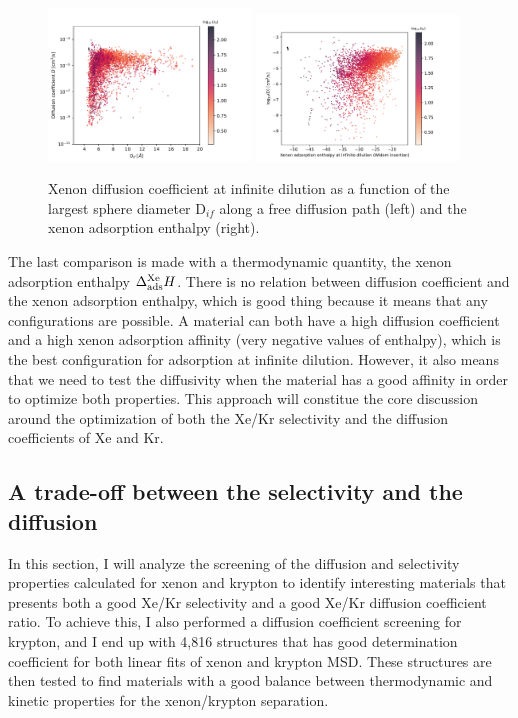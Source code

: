 \documentclass[main]{subfiles}
\begin{document}
\begin{figure}[ht]
  \centering
    \includegraphics[width=0.48\textwidth]{figures/5-diffusion/D_log-lcd_s_+.pdf}
    \includegraphics[width=0.48\textwidth]{figures/5-diffusion/D_log-H_Xe_s_+.pdf}
    \caption{Xenon diffusion coefficient at infinite dilution as a function of the largest sphere diameter D$_{if}$ along a free diffusion path (left) and the xenon adsorption enthalpy (right). }\label{fgr:diff_H_lcd}
\end{figure}

The last comparison is made with a thermodynamic quantity, the xenon adsorption enthalpy $\Delta_{\text{ads}}^{\text{Xe}}H$. There is no relation between diffusion coefficient and the xenon adsorption enthalpy, which is good thing because it means that any configurations are possible. A material can both have a high diffusion coefficient and a high xenon adsorption affinity (very negative values of enthalpy), which is the best configuration for adsorption at infinite dilution. However, it also means that we need to test the diffusivity when the material has a good affinity in order to optimize both properties. This approach will constitue the core discussion around the optimization of both the Xe/Kr selectivity and the diffusion coefficients of Xe and Kr.  

\subsection{A trade-off between the selectivity and the diffusion}

In this section, I will analyze the screening of the diffusion and selectivity properties calculated for xenon and krypton to identify interesting materials that presents both a good Xe/Kr selectivity and a good Xe/Kr diffusion coefficient ratio. To achieve this, I also performed a diffusion coefficient screening for krypton, and I end up with 4,816 structures that has good determination coefficient for both linear fits of xenon and krypton MSD. These structures are then tested to find materials with a good balance between thermodynamic and kinetic properties for the xenon/krypton separation.
\end{document}
